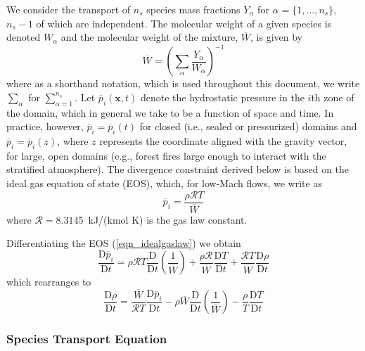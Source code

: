 We consider the transport of $n_s$ species mass fractions $Y_\alpha$ for $\alpha = \{1,\ldots,n_s\}$, $n_s-1$ of which are independent.
The molecular weight of a given species is denoted $W_\alpha$ and the molecular weight of the mixture, $\overline{W}$, is given by
\begin{equation}
\label{eqn_mixmolewt}
\overline{W} = \left( \sum_{\alpha} \frac{Y_\alpha}{W_\alpha} \right)^{-1}
\end{equation}
where as a shorthand notation, which is used throughout this document, we write $\sum_\alpha$ for $\sum_{\alpha = 1}^{n_s}$.
Let $\overline{p}_i(\mathbf{x},t)$ denote the hydrostatic pressure in the $i$th zone of the domain, which in general we take to be a function of space and time.
In practice, however, $\overline{p}_i = \overline{p}_i(t)$ for closed (i.e., sealed or pressurized) domains and $\overline{p}_i = \overline{p}_i(z)$,
where $z$ represents the coordinate aligned with the gravity vector, for large, open domains (e.g., forest fires large enough to interact with the stratified atmosphere).
The divergence constraint derived below is based on the ideal gas equation of state (EOS), which, for low-Mach flows, we write as
\begin{equation}
\label{eqn_idealgaslaw}
\overline{p}_i = \frac{\rho \mathcal{R} T}{\overline{W}}
\end{equation}
where $\mathcal{R} = 8.3145$~kJ/(kmol K) is the gas law constant.

Differentiating the EOS (\ref{eqn_idealgaslaw}) we obtain
\begin{equation}
\label{eqn_DEOS1}
\frac{\mbox{D} \overline{p}_i}{\mbox{D} t} = \rho \mathcal{R} T \frac{\mbox{D}}{\mbox{D} t}\left(\frac{1}{\overline{W}}\right) +
\frac{\rho \mathcal{R}}{\overline{W}} \frac{\mbox{D} T}{\mbox{D} t} + \frac{\mathcal{R}T}{\overline{W}} \frac{\mbox{D} \rho}{\mbox{D} t}
\end{equation}
which rearranges to
\begin{equation}
\label{eqn_DEOS2}
\frac{\mbox{D} \rho}{\mbox{D} t} = \frac{\overline{W}}{\mathcal{R}T} \frac{\mbox{D}\overline{p}_i}{\mbox{D} t} -
\rho \overline{W} \frac{\mbox{D}}{\mbox{D} t}\left(\frac{1}{\overline{W}}\right) - \frac{\rho}{T} \frac{\mbox{D} T}{\mbox{D} t}
\end{equation}


\subsubsection{Species Transport Equation}
\label{species_transport}

